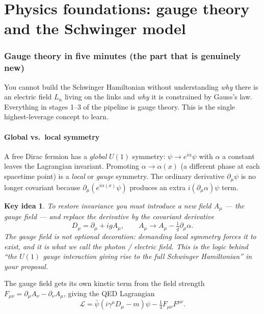\documentclass[11pt,a4paper]{article}
\newtheorem{keyidea}{Key idea}[section]
\begin{document}
\part{Physics foundations: gauge theory and the Schwinger model}

\section{Gauge theory in five minutes (the part that is genuinely new)}\label{sec:gauge}

\begin{whybox}
You cannot build the Schwinger Hamiltonian without understanding \emph{why} there is an electric
field $L_n$ living on the links and \emph{why} it is constrained by Gauss's law. Everything in
stages 1--3 of the pipeline is gauge theory. This is the single highest-leverage concept to learn.
\end{whybox}

\subsection{Global vs.\ local symmetry}
A free Dirac fermion has a \emph{global} $U(1)$ symmetry: $\psi \to e^{i\alpha}\psi$ with $\alpha$
a constant leaves the Lagrangian invariant. Promoting $\alpha \to \alpha(x)$ (a different phase at
each spacetime point) is a \emph{local} or \emph{gauge} symmetry. The ordinary derivative
$\partial_\mu \psi$ is no longer covariant because $\partial_\mu(e^{i\alpha(x)}\psi)$ produces an
extra $i(\partial_\mu\alpha)\psi$ term.

\begin{keyidea}
To restore invariance you must introduce a new field $A_\mu$ --- the gauge field --- and replace
the derivative by the \emph{covariant derivative}
\begin{equation}
D_\mu = \partial_\mu + i g A_\mu, \qquad A_\mu \to A_\mu - \tfrac{1}{g}\partial_\mu\alpha .
\label{eq:covderiv}
\end{equation}
The gauge field is not optional decoration: \emph{demanding local symmetry forces it to exist}, and
it is what we call the photon / electric field. This is the logic behind ``the $U(1)$ gauge
interaction giving rise to the full Schwinger Hamiltonian'' in your proposal.
\end{keyidea}

The gauge field gets its own kinetic term from the field strength
$F_{\mu\nu}=\partial_\mu A_\nu-\partial_\nu A_\mu$, giving the QED Lagrangian
\begin{equation}
\mathcal{L} = \bar\psi(i\gamma^\mu D_\mu - m)\psi - \tfrac{1}{4}F_{\mu\nu}F^{\mu\nu}.
\label{eq:qedlagrangian}
\end{equation}
\end{document}
